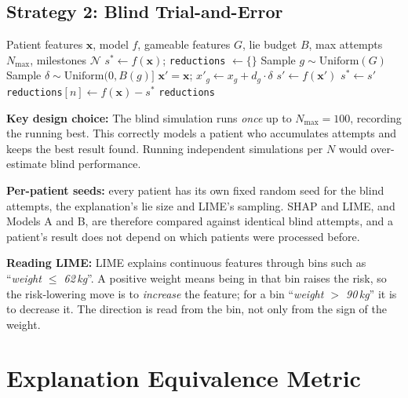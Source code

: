 \documentclass[12pt, a4paper, oneside]{report}
\theoremstyle{definition}
\begin{document}
\subsection{Strategy 2: Blind Trial-and-Error}

\begin{algorithm}
  \caption{Blind Trial-and-Error (sequential, best-so-far)}
  \label{alg:blind}
  \begin{algorithmic}[1]
    \Require Patient features $\mathbf{x}$, model $f$, gameable features $G$,
             lie budget $B$, max attempts $N_{\max}$, milestones $\mathcal{N}$
    \State $s^* \leftarrow f(\mathbf{x})$; \texttt{reductions} $\leftarrow \{\}$
      \State Sample $g \sim \mathrm{Uniform}(G)$
      \State Sample $\delta \sim \mathrm{Uniform}(0, B(g)]$
      \State $\mathbf{x}' = \mathbf{x}$; $x'_g \leftarrow x_g + d_g \cdot \delta$
      \State $s' \leftarrow f(\mathbf{x}')$
        \State $s^* \leftarrow s'$  
      \EndIf
        \State \texttt{reductions}$[n] \leftarrow f(\mathbf{x}) - s^*$
      \EndIf
    \EndFor
    \State \Return \texttt{reductions}
  \end{algorithmic}
\end{algorithm}

\textbf{Key design choice:} The blind simulation runs \textit{once} up to
$N_{\max} = 100$, recording the running best. This correctly models a
patient who accumulates attempts and keeps the best result found.
Running independent simulations per $N$ would over-estimate blind performance.

\textbf{Per-patient seeds:} every patient has its own fixed random seed
for the blind attempts, the explanation's lie size and LIME's sampling.
SHAP and LIME, and Models A and B, are therefore compared against
identical blind attempts, and a patient's result does not depend on
which patients were processed before.

\textbf{Reading LIME:} LIME explains continuous features through bins
such as ``\emph{weight $\leq$ 62\,kg}''. A positive weight means being
in that bin raises the risk, so the risk-lowering move is to
\emph{increase} the feature; for a bin ``\emph{weight $>$ 90\,kg}'' it is
to decrease it. The direction is read from the bin, not only from the
sign of the weight.

\section{Explanation Equivalence Metric}
\end{document}

